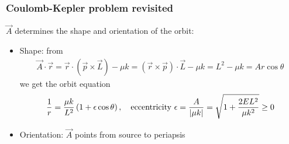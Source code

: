 \documentclass{beamer}
\theoremstyle{definition}
\newcommand{\lp}{\left(}
\newcommand{\rp}{\right)}
\newcommand{\f}[2]{\frac{#1}{#2}}
\begin{document}
\begin{frame}
\frametitle{Coulomb-Kepler problem revisited}
$\vec{A}$ determines the shape and orientation of the orbit: \pause

\begin{itemize}

\item Shape: from
\begin{align*}
\vec{A} \cdot \vec{r} = \vec{r} \cdot (\vec{p} \times \vec{L}) - \mu k = (\vec{r}\times \vec{p})\cdot \vec{L} - \mu k = L^2 - \mu k  =  A r \cos\theta
\end{align*}
\pause
we get the orbit equation
\begin{align*}
\f{1}{r} = \f{\mu k }{L^2} \lp 1 + \epsilon \cos\theta \rp, \quad  
\text{eccentricity } \epsilon = \f{A}{\abs{\mu k}} = \sqrt{1 + \f{2EL^2}{\mu k^2}} \geq 0
\end{align*}\pause 

\item Orientation: $\vec{A}$ points from source to periapsis
\end{itemize}

\end{frame}
\end{document}
